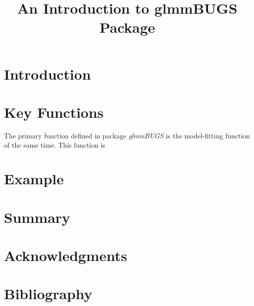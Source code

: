 \documentclass{article}
\title{An Introduction to glmmBUGS Package}
\begin{document}
\maketitle

\large
\section{Introduction}


\section{Key Functions}
The primary function defined in package \textit{glmmBUGS} is the model-fitting function of the same time.
This function is 

\section{Example}

\section{Summary}

\section{Acknowledgments}


\section{Bibliography}
\end{document}

